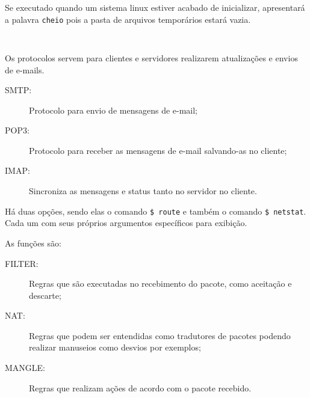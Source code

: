 \documentclass[answers]{exam}
\begin{document}
\begin{questions}
\begin{framed}
Se executado quando um sistema linux estiver acabado de inicializar, apresentará a palavra \texttt{cheio} pois a pasta de arquivos temporários estará vazia.
\end{framed}



\begin{framed}
\texttt{ }
\end{framed}



\begin{framed}
Os protocolos servem para clientes e servidores realizarem atualizações e envios de e-mails.
\begin{description}
    \item[SMTP:] Protocolo para envio de mensagens de e-mail;
    \item[POP3:] Protocolo para receber as mensagens de e-mail salvando-as no cliente;
    \item[IMAP:] Sincroniza as mensagens e status tanto no servidor no cliente.
\end{description}
\end{framed}



\begin{framed}
Há duas opções, sendo elas o comando \texttt{\$ route} e também o comando \texttt{\$ netstat}. 
Cada um com seus próprios argumentos específicos para exibição.
\end{framed}



\begin{framed}
As funções são:
\begin{description}
    \item[FILTER:] Regras que são executadas no recebimento do pacote, como aceitação e descarte;
    \item[NAT:] Regras que podem ser entendidas como tradutores de pacotes podendo realizar manuseios como desvios por exemplos;
    \item[MANGLE:] Regras que realizam ações de acordo com o pacote recebido.
\end{description}
\end{framed}




\end{questions}
\end{document}
